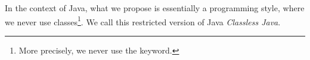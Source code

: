 
%
%
%
%



In the context of Java, what we propose is essentially a programming
style, where we never use classes\footnote{More precisely, we never
  use the \Q@class@ keyword.}.  We call this restricted version of
Java \emph{Classless Java}.  




